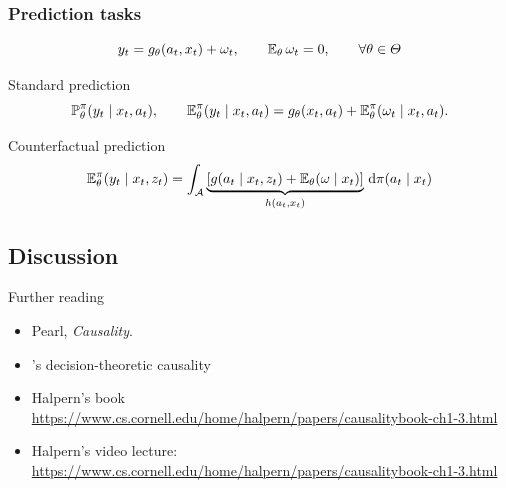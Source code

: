 \begin{frame}
  \frametitle{Prediction tasks}
  \begin{equation}
    \label{eq:price}
    y_t = g_\theta(a_t, x_t) + \omega_t, \qquad \mathop{\mbox{\ensuremath{\mathbb{E}}}}\nolimits_\theta \omega_t = 0, \qquad \forall \theta \in \Theta
  \end{equation}
  \begin{block}{Standard prediction}
    \[
    \mathop{\mbox{\ensuremath{\mathbb{P}}}}\nolimits_\theta^\pi(y_t \mid x_t, a_t), \qquad  \mathop{\mbox{\ensuremath{\mathbb{E}}}}\nolimits^\pi_\theta(y_t \mid x_t, a_t) = g_\theta(x_t, a_t) + \mathop{\mbox{\ensuremath{\mathbb{E}}}}\nolimits_\theta^\pi(\omega_t \mid x_t, a_t).
    \]
  \end{block}

  \begin{block}{Counterfactual prediction}
    \[
    \mathop{\mbox{\ensuremath{\mathbb{E}}}}\nolimits^\pi_\theta(y_t \mid x_t, z_t) = 
    \int_{\mathcal{A}} \underbrace{[g(a_t \mid x_t, z_t) + \mathop{\mbox{\ensuremath{\mathbb{E}}}}\nolimits_\theta(\omega \mid x_t)]}_{h(a_t, x_t)} \,\mathrm{d} \pi(a_t \mid x_t)
    \]
  \end{block}

  
\end{frame}





\subsection{Discussion}
\begin{frame}
  \begin{block}{Further reading}
    \begin{itemize}
    \item Pearl, \emph{Causality}.
    \item \citet{dawid2012decision}'s decision-theoretic causality
    \item Halpern's book  \url{https://www.cs.cornell.edu/home/halpern/papers/causalitybook-ch1-3.html}
    \item Halpern's video lecture: \url{https://www.cs.cornell.edu/home/halpern/papers/causalitybook-ch1-3.html}
    \end{itemize}
  \end{block}
\end{frame}

